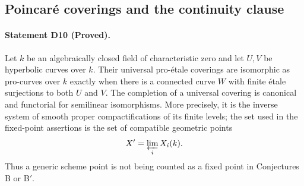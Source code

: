 \subsection{Poincar\'e coverings and the continuity clause}

\paragraph{Statement D10 (Proved).}\label{res:D10}
Let $k$ be an algebraically closed field of characteristic zero and let
$U,V$ be hyperbolic curves over $k$.  Their universal pro-\'etale
coverings are isomorphic as pro-curves over $k$ exactly when there is a
connected curve $W$ with finite \'etale surjections to both $U$ and $V$.
The completion of a universal covering is canonical and functorial for
semilinear isomorphisms.  More precisely, it is the inverse system of
smooth proper compactifications of its finite levels; the set used in
the fixed-point assertions is the set of compatible geometric points
\[
                       X'=\varprojlim_i X_i(k).
\]
Thus a generic scheme point is not being counted as a fixed point in
Conjectures B or B$'$.

